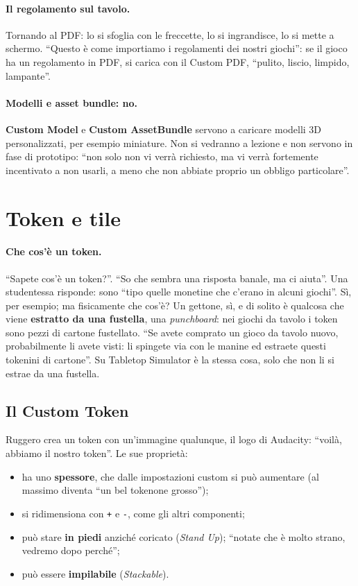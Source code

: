 \paragraph{Il regolamento sul tavolo.} Tornando al PDF: lo si sfoglia con le
freccette, lo si ingrandisce, lo si mette a schermo. ``Questo è come importiamo i
regolamenti dei nostri giochi'': se il gioco ha un regolamento in PDF, si carica con il
Custom PDF, ``pulito, liscio, limpido, lampante''.

\paragraph{Modelli e asset bundle: no.} \textbf{Custom Model} e \textbf{Custom
AssetBundle} servono a caricare modelli 3D personalizzati, per esempio miniature. Non
si vedranno a lezione e non servono in fase di prototipo: ``non solo non vi verrà
richiesto, ma vi verrà fortemente incentivato a non usarli, a meno che non abbiate
proprio un obbligo particolare''.

\section{Token e tile}
\label{a8:sec:token}

\paragraph{Che cos'è un token.} ``Sapete cos'è un token?''. ``So che sembra una risposta
banale, ma ci aiuta''. Una studentessa risponde: sono ``tipo quelle monetine che
c'erano in alcuni giochi''. Sì, per esempio; ma fisicamente che cos'è? Un gettone, sì,
e di solito è qualcosa che viene \textbf{estratto da una fustella}, una
\emph{punchboard}: nei giochi da tavolo i token sono pezzi di cartone fustellato. ``Se
avete comprato un gioco da tavolo nuovo, probabilmente li avete visti: li spingete via
con le manine ed estraete questi tokenini di cartone''. Su Tabletop Simulator è la
stessa cosa, solo che non li si estrae da una fustella.

\subsection{Il Custom Token}
\label{a8:sec:custom-token}

Ruggero crea un token con un'immagine qualunque, il logo di Audacity: ``voilà, abbiamo
il nostro token''. Le sue proprietà:
\begin{itemize}
  \item ha uno \textbf{spessore}, che dalle impostazioni custom si può aumentare (al
        massimo diventa ``un bel tokenone grosso'');
  \item si ridimensiona con \texttt{+} e \texttt{-}, come gli altri componenti;
  \item può stare \textbf{in piedi} anziché coricato (\emph{Stand Up}); ``notate che è
        molto strano, vedremo dopo perché'';
  \item può essere \textbf{impilabile} (\emph{Stackable}).
\end{itemize}

